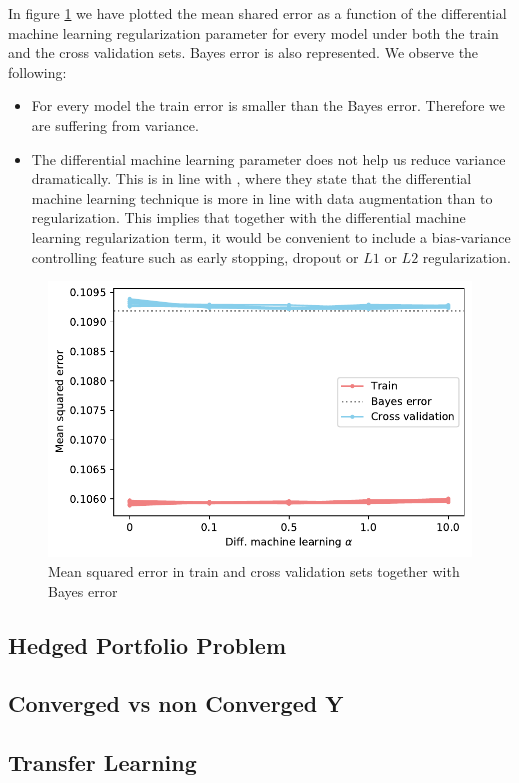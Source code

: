 In figure \ref{fig:MSE_CV_train_test} we have plotted the mean shared error as a function of the differential machine learning regularization parameter for every model under both the train and the cross validation sets. Bayes error is also represented. We observe the following:

\begin{itemize}
    \item For every model the train error is smaller than the Bayes error. Therefore we are suffering from variance.   
    \item The differential machine learning parameter does not help us reduce variance dramatically. This is in line with \cite{HugeSavine}, where they state that the differential machine learning technique is more in line with data augmentation than to regularization. This implies that together with the differential machine learning regularization term, it would be convenient to include a bias-variance controlling feature such as early stopping, dropout or $L1$ or $L2$ regularization.
\end{itemize}





\begin{figure}[H] 
\centering
\includegraphics[width=1.0\textwidth]{Figures/MarketRisk/train_test_mse.pdf}
\caption{Mean squared error in train and cross validation sets together with Bayes error}
\label{fig:MSE_CV_train_test}
\end{figure}

\cite{dirac}

\cite{einstein}





\subsection{Hedged Portfolio Problem}
\subsection{Converged vs non Converged Y}
\subsection{Transfer Learning}





